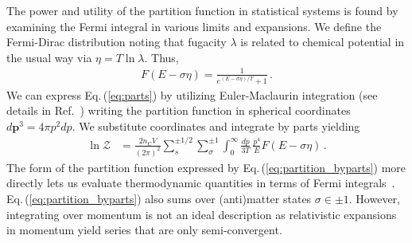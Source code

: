 \documentclass[epjST]{svjour}
\newcommand{\req}[1]{Eq.\,(\ref{#1})}
\begin{document}
The power and utility of the partition function in statistical systems is found by examining the Fermi integral in various limits and expansions. We define the Fermi-Dirac distribution noting that fugacity \(\lambda\) is related to chemical potential in the usual way via \(\eta = T\ln\lambda\). Thus,
\begin{align}
    F\left(E - \sigma\eta\right) = \frac{1}{e^{(E - \sigma\eta)/T} + 1}\,.
\end{align}
We can express \req{eq:parts} by utilizing Euler-Maclaurin integration (see details in Ref.~\cite{Steinmetz:2023nsc}) writing the partition function in spherical coordinates \(d\mathbf{p}^{3}=4\pi p^{2}dp\). We substitute coordinates and integrate by parts yielding
\begin{align}
    \label{eq:partition_byparts}
    \ln\mathcal{Z} &= \frac{2 n_\mathrm{C}V}{(2\pi)^{2}} \sum_{s}^{\pm1/2}\sum_{\sigma}^{\pm1}\int_{0}^{\infty} \frac{dp}{3T} \, \frac{p^4}{E}F\left(E - \sigma\eta\right)\,.
\end{align}
The form of the partition function expressed by \req{eq:partition_byparts} more directly lets us evaluate thermodynamic quantities in terms of Fermi integrals~\cite{Elze:1980er,Birrell:2024bdb}. \req{eq:partition_byparts} also sums over (anti)matter states \(\sigma \in {\pm1}\). However, integrating over momentum is not an ideal description as relativistic expansions in momentum yield series that are only semi-convergent. 

\end{document}
